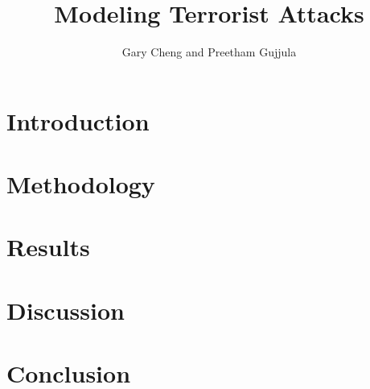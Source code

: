 \documentclass{paper}
\title{Modeling Terrorist Attacks}
\author{Gary Cheng and Preetham Gujjula}
\begin{document}
\maketitle 

\section{Introduction}
\section{Methodology}
\section{Results}
\section{Discussion}
\section{Conclusion}
\end{document}

